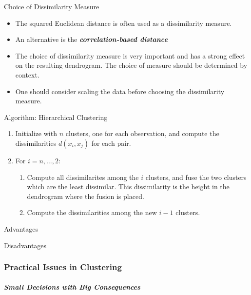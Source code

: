 \documentclass[11pt]{article}
\providecommand{\tightlist}{%
      \setlength{\itemsep}{0pt}\setlength{\parskip}{0pt}}
\begin{document}
    Choice of Dissimilarity Measure

    \begin{itemize}
\tightlist
\item
  The squared Euclidean distance is often used as a dissimilarity
  measure.
\item
  An alternative is the \textbf{\emph{correlation-based distance}}
\item
  The choice of dissimilarity measure is very important and has a strong
  effect on the resulting dendrogram. The choice of measure should be
  determined by context.
\item
  One should consider scaling the data before choosing the dissimilarity
  measure.
\end{itemize}

    Algorithm: Hierarchical Clustering

    \begin{enumerate}
\def\labelenumi{\arabic{enumi}.}
\tightlist
\item
  Initialize with \(n\) clusters, one for each observation, and compute
  the dissimilarities \(d(x_i, x_j)\) for each pair.
\item
  For \(i = n, \dots, 2\):

  \begin{enumerate}
  \def\labelenumii{\arabic{enumii}.}
  \tightlist
  \item
    Compute all dissimilarites among the \(i\) clusters, and fuse the
    two clusters which are the least dissimilar. This dissimilarity is
    the height in the dendrogram where the fusion is placed.
  \item
    Compute the dissimilarities among the new \(i -1\) clusters.
  \end{enumerate}
\end{enumerate}

    Advantages

    Disadvantages

    \hypertarget{practical-issues-in-clustering}{%
\subsubsection{Practical Issues in
Clustering}\label{practical-issues-in-clustering}}

    \hypertarget{small-decisions-with-big-consequences}{%
\subparagraph{Small Decisions with Big
Consequences}\label{small-decisions-with-big-consequences}}
\end{document}
